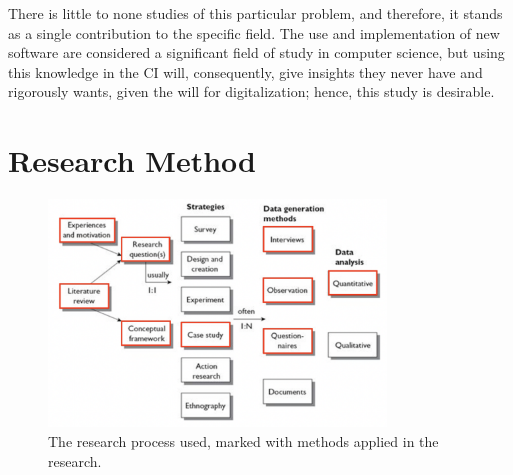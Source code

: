 There is little to none studies of this particular problem, and therefore, it stands as a single contribution to the specific field. The use and implementation of new software are considered a significant field of study in computer science, but using this knowledge in the CI will, consequently, give insights they never have and rigorously wants, given the will for digitalization; hence, this study is desirable.

\section{Research Method}

\begin{figure}
    \begin{center}
        \includegraphics[width=0.8\textwidth]{fig/empirisk_studie.png}
        \caption{The research process used, marked with methods applied in the research.}
    \end{center}
    \label{fig:my_label}
\end{figure}


